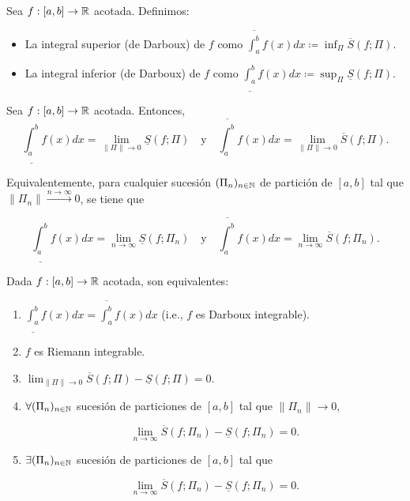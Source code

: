 \begin{definition}
	Sea $f:[a,b]\to\mathbb{R}$ acotada. Definimos:
	\begin{itemize}
		\item La integral superior (de Darboux) de $f$ como $\overline{\int_{a}^{b}} f(x) dx \coloneq \displaystyle{\inf_{\Pi}} \overline{S}(f;\Pi)$.
		
		\item La integral inferior (de Darboux) de $f$ como $\underline{\int_{a}^{b}} f(x) dx \coloneq \displaystyle{\sup_{\Pi}} \underline{S}(f;\Pi)$.
	\end{itemize}
\end{definition}

\begin{theorem}
	Sea $f:[a,b]\to\mathbb{R}$ acotada. Entonces,
	\[
	\underline{\int_{a}^{b}} f(x) dx = \displaystyle{\lim_{\|\Pi\|\to 0}} \underline{S}(f;\Pi)\quad \text{y} \quad \overline{\int_{a}^{b}} f(x) dx = \displaystyle{\lim_{\|\Pi\|\to 0}}\overline{S}(f;\Pi).
	\]
\end{theorem}

\begin{remark}
	Equivalentemente, para cualquier sucesión $(\Pi_n)_{n\in\mathbb{N}}$ de partición de $[a,b]$ tal que $\|\Pi_n\|\xrightarrow{n\to\infty} 0$, se tiene que 

	\[
	\underline{\int_{a}^{b}} f(x) dx = \lim_{n\to\infty} \underline{S}(f;\Pi_n)\quad\text{y}\quad \overline{\int_{a}^{b}} f(x) dx = \lim_{n\to \infty} \overline{S}(f;\Pi_n).
	\]
\end{remark}

\begin{theorem}
	Dada $f:[a,b]\to\mathbb{R}$ acotada, son equivalentes:

	\begin{enumerate}
		\item $\underline{\int_{a}^{b}} f(x) dx = \overline{\int_{a}^{b}} f(x) dx$ (i.e., $f$ es Darboux integrable).

		\item $f$ es Riemann integrable.

		\item $\lim_{\|\Pi\|\to 0} \overline{S}(f;\Pi)-\underline{S}(f;\Pi)=0$.

		\item $\forall (\Pi_n)_{n\in\mathbb{N}}$ sucesión de particiones de $[a,b]$ tal que $\|\Pi_n\|\to 0$, 

		\[
		\lim_{n \to \infty} \overline{S}(f;\Pi_n)-\underline{S}(f;\Pi_n)=0.
		\]

		\item $\exists (\Pi_n)_{n\in\mathbb{N}}$ sucesión de particiones de $[a,b]$ tal que 

		\[
		\lim_{n \to \infty}\overline{S}(f;\Pi_n)-\underline{S}(f;\Pi_n)=0.
		\]
	\end{enumerate}
\end{theorem}
